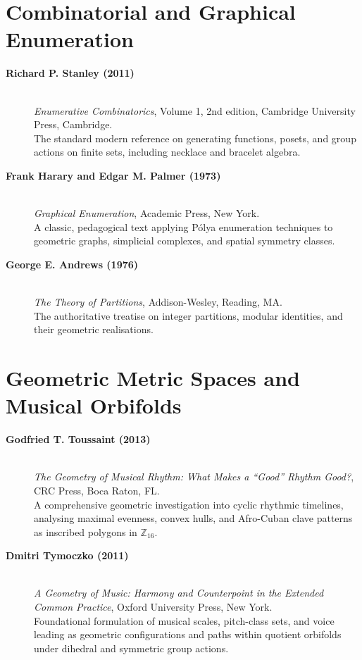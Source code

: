 \section*{Combinatorial and Graphical Enumeration}

\begin{description}
    \item[\textbf{Richard P. Stanley (2011)}]\mbox{}\\
    \emph{Enumerative Combinatorics}, Volume 1, 2nd edition, Cambridge University Press, Cambridge.\\
    The standard modern reference on generating functions, posets, and group actions on finite sets, including necklace and bracelet algebra.

    \item[\textbf{Frank Harary and Edgar M. Palmer (1973)}]\mbox{}\\
    \emph{Graphical Enumeration}, Academic Press, New York.\\
    A classic, pedagogical text applying P\'olya enumeration techniques to geometric graphs, simplicial complexes, and spatial symmetry classes.

    \item[\textbf{George E. Andrews (1976)}]\mbox{}\\
    \emph{The Theory of Partitions}, Addison-Wesley, Reading, MA.\\
    The authoritative treatise on integer partitions, modular identities, and their geometric realisations.
\end{description}

\section*{Geometric Metric Spaces and Musical Orbifolds}

\begin{description}
    \item[\textbf{Godfried T. Toussaint (2013)}]\mbox{}\\
    \emph{The Geometry of Musical Rhythm: What Makes a ``Good'' Rhythm Good?}, CRC Press, Boca Raton, FL.\\
    A comprehensive geometric investigation into cyclic rhythmic timelines, analysing maximal evenness, convex hulls, and Afro-Cuban clave patterns as inscribed polygons in $\mathbb{Z}_{16}$.

    \item[\textbf{Dmitri Tymoczko (2011)}]\mbox{}\\
    \emph{A Geometry of Music: Harmony and Counterpoint in the Extended Common Practice}, Oxford University Press, New York.\\
    Foundational formulation of musical scales, pitch-class sets, and voice leading as geometric configurations and paths within quotient orbifolds under dihedral and symmetric group actions.
\end{description}

